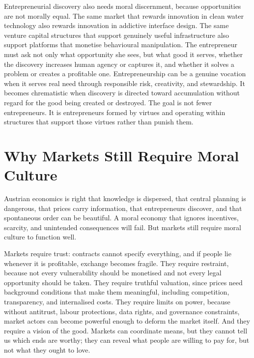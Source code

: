 \documentclass[11pt,a4paper,oneside]{book}
\begin{document}
Entrepreneurial discovery also needs moral discernment, because opportunities are not morally equal. The same market that rewards innovation in clean water technology also rewards innovation in addictive interface design. The same venture capital structures that support genuinely useful infrastructure also support platforms that monetise behavioural manipulation. The entrepreneur must ask not only what opportunity she sees, but what good it serves, whether the discovery increases human agency or captures it, and whether it solves a problem or creates a profitable one. Entrepreneurship can be a genuine vocation when it serves real need through responsible risk, creativity, and stewardship. It becomes chrematistic when discovery is directed toward accumulation without regard for the good being created or destroyed. The goal is not fewer entrepreneurs. It is entrepreneurs formed by virtues and operating within structures that support those virtues rather than punish them.

\section*{Why Markets Still Require Moral Culture}

Austrian economics is right that knowledge is dispersed, that central planning is dangerous, that prices carry information, that entrepreneurs discover, and that spontaneous order can be beautiful. A moral economy that ignores incentives, scarcity, and unintended consequences will fail. But markets still require moral culture to function well.

Markets require trust: contracts cannot specify everything, and if people lie whenever it is profitable, exchange becomes fragile. They require restraint, because not every vulnerability should be monetised and not every legal opportunity should be taken. They require truthful valuation, since prices need background conditions that make them meaningful, including competition, transparency, and internalised costs. They require limits on power, because without antitrust, labour protections, data rights, and governance constraints, market actors can become powerful enough to deform the market itself. And they require a vision of the good. Markets can coordinate means, but they cannot tell us which ends are worthy; they can reveal what people are willing to pay for, but not what they ought to love.
\end{document}
